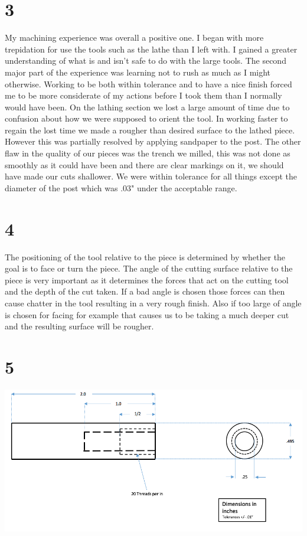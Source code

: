 \documentclass[11pt,letterpaper]{article}
\begin{document}
\section*{3} %
My machining experience was overall a positive one. I began with more trepidation for use the tools such as the lathe than I left with. I gained a greater understanding of what is and isn't safe to do with the large tools. The second major part of the experience was learning not to rush as much as I might otherwise. Working to be both within tolerance and to have a nice finish forced me to be more considerate of my actions before I took them than I normally would have been. On the lathing section we lost a large amount of time due to confusion about how we were supposed to orient the tool. In working faster to regain the lost time we made a rougher than desired surface to the lathed piece. However this was partially resolved by applying sandpaper to the post. The other flaw in the quality of our pieces was the trench we milled, this was not done as smoothly as it could have been and there are clear markings on it, we should have made our cuts shallower. We were within tolerance for all things except the diameter of the post which was .03" under the acceptable range.
\section*{4} %
The positioning of the tool relative to the piece is determined by whether the goal is to face or turn the piece. The angle of the cutting surface relative to the piece is very important as it determines the forces that act on the cutting tool and the depth of the cut taken. If a bad angle is chosen those forces can then cause chatter in the tool resulting in a very rough finish. Also if too large of angle is chosen for facing for example that causes us to be taking a much deeper cut and the resulting surface will be rougher.
\section*{5} %
\includegraphics[width=\textwidth]{techDrawing.png}
\end{document}
